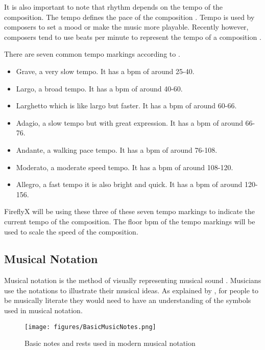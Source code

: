 It is also important to note that rhythm depends on the tempo of the composition. The tempo defines the pace of the composition \cite{rivadelo1986fundamentals, nelson2009foundations}. Tempo is used by composers to set a mood or make the music more playable. Recently however, composers tend to use beats per minute to represent the tempo of a composition \cite{nelson2009foundations}.

There are seven common tempo markings according to \citeauthor{nelson2009foundations}. 
\begin{itemize}
    \item Grave, a very slow tempo. It has a bpm of around 25-40.
    \item Largo, a broad tempo. It has a bpm of around 40-60.
    \item Larghetto which is like largo but faster. It has a bpm of around 60-66.
    \item Adagio, a slow tempo but with great expression. It has a bpm of around 66-76.
    \item Andante, a walking pace tempo. It has a bpm of around 76-108.
    \item Moderato, a moderate speed tempo. It has a bpm of around 108-120.
    \item Allegro, a fast tempo it is also bright and quick. It has a bpm of around 120-156. 
\end{itemize}

FireflyX will be using these three of these seven tempo markings to indicate the current tempo of the composition. The floor bpm of the tempo markings will be used to scale the speed of the composition.

\subsection{Musical Notation}
Musical notation is the method of visually representing musical sound \cite{read1964music}. Musicians use the notations to illustrate their musical ideas. As explained by , for people to be musically literate they would need to have an understanding of the symbols used in musical notation.

\begin{figure}[H]
    \centering
    \texttt{[image: figures/BasicMusicNotes.png]}
    \caption{Basic notes and rests used in modern musical notation \protect\cite{BasicNotes2016}}
    \label{fig:BasicNotes2016}
\end{figure}

